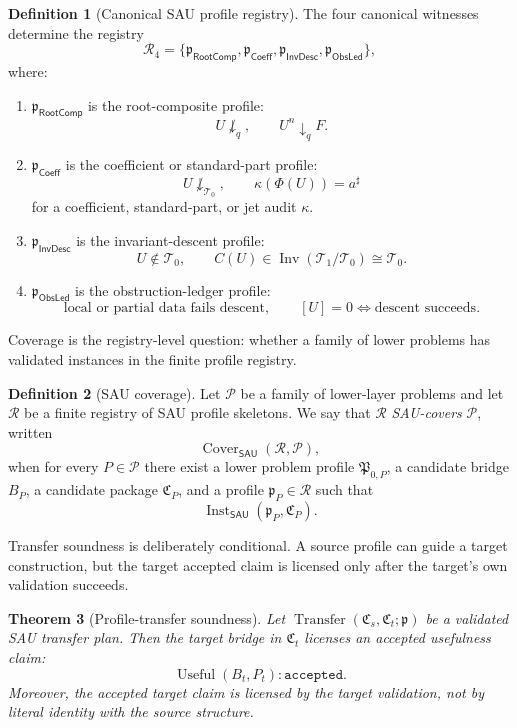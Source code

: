\documentclass[11pt]{article}
\newcommand{\SAU}{\mathsf{SAU}}
\newcommand{\Use}{\operatorname{Useful}}
\newcommand{\Inst}{\operatorname{Inst}}
\newcommand{\Transfer}{\operatorname{Transfer}}
\newcommand{\Cover}{\operatorname{Cover}}
\newcommand{\RootComp}{\mathsf{RootComp}}
\newcommand{\Coeff}{\mathsf{Coeff}}
\newcommand{\InvDesc}{\mathsf{InvDesc}}
\newcommand{\ObsLed}{\mathsf{ObsLed}}
\newtheorem{theorem}{Theorem}[section]
\theoremstyle{definition}
\newtheorem{definition}[theorem]{Definition}
\begin{document}
\begin{definition}[Canonical SAU profile registry]
\label{def:sau-canonical-profile-registry}
The four canonical witnesses determine the registry
\[
\mathcal R_4=
\{\mathfrak p_{\RootComp},\mathfrak p_{\Coeff},\mathfrak p_{\InvDesc},\mathfrak p_{\ObsLed}\},
\]
where:
\begin{enumerate}
\item \(\mathfrak p_{\RootComp}\) is the root-composite profile:
\[
U\not\downarrow_q,
\qquad
U^n\downarrow_q F.
\]
\item \(\mathfrak p_{\Coeff}\) is the coefficient or standard-part profile:
\[
U\not\downarrow_{\mathcal T_0},
\qquad
\kappa(\Phi(U))=a^\sharp
\]
for a coefficient, standard-part, or jet audit \(\kappa\).
\item \(\mathfrak p_{\InvDesc}\) is the invariant-descent profile:
\[
U\notin \mathcal T_0,
\qquad
C(U)\in \operatorname{Inv}(\mathcal T_1/\mathcal T_0)\cong \mathcal T_0.
\]
\item \(\mathfrak p_{\ObsLed}\) is the obstruction-ledger profile:
\[
\text{local or partial data fails descent},
\qquad
[U]=0\iff\text{descent succeeds}.
\]
\end{enumerate}
\end{definition}

Coverage is the registry-level question: whether a family of lower problems has
validated instances in the finite profile registry.

\begin{definition}[SAU coverage]
\label{def:sau-coverage}
Let \(\mathcal P\) be a family of lower-layer problems and let \(\mathcal R\) be a finite registry of SAU profile skeletons.  We say that \(\mathcal R\) \emph{SAU-covers} \(\mathcal P\), written
\[
\Cover_{\SAU}(\mathcal R,\mathcal P),
\]
when for every \(P\in\mathcal P\) there exist a lower problem profile \(\mathfrak P_{0,P}\), a candidate bridge \(B_P\), a candidate package \(\mathfrak C_P\), and a profile \(\mathfrak p_P\in\mathcal R\) such that
\[
\Inst_{\SAU}(\mathfrak p_P,\mathfrak C_P).
\]
\end{definition}

Transfer soundness is deliberately conditional.  A source profile can guide a
target construction, but the target accepted claim is licensed only after the
target's own validation succeeds.

\begin{theorem}[Profile-transfer soundness]
\label{thm:sau-profile-transfer-soundness}
Let \(\Transfer(\mathfrak C_s,\mathfrak C_t;\mathfrak p)\) be a validated SAU transfer plan.  Then the target bridge in \(\mathfrak C_t\) licenses an accepted usefulness claim:
\[
\Use(B_t,P_t):\texttt{accepted}.
\]
Moreover, the accepted target claim is licensed by the target validation, not by literal identity with the source structure.
\end{theorem}
\end{document}
